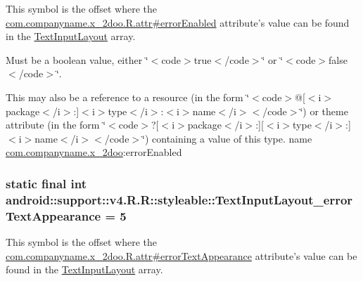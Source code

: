 This symbol is the offset where the \hyperlink{classcom_1_1companyname_1_1x__2doo_1_1_r_1_1attr_29b4019563d2396aa0851e063ee4d087}{com.companyname.x\_\-2doo.R.attr\#errorEnabled} attribute's value can be found in the \hyperlink{classandroid_1_1support_1_1v4_1_1_r_1_1styleable_880beb171ce483ab1b63a82ef7f9d976}{TextInputLayout} array.

Must be a boolean value, either \char`\"{}$<$code$>$true$<$/code$>$\char`\"{} or \char`\"{}$<$code$>$false$<$/code$>$\char`\"{}. 

This may also be a reference to a resource (in the form \char`\"{}$<$code$>$@\mbox{[}$<$i$>$package$<$/i$>$:\mbox{]}$<$i$>$type$<$/i$>$:$<$i$>$name$<$/i$>$$<$/code$>$\char`\"{}) or theme attribute (in the form \char`\"{}$<$code$>$?\mbox{[}$<$i$>$package$<$/i$>$:\mbox{]}\mbox{[}$<$i$>$type$<$/i$>$:\mbox{]}$<$i$>$name$<$/i$>$$<$/code$>$\char`\"{}) containing a value of this type.  name \hyperlink{namespacecom_1_1companyname_1_1x__2doo}{com.companyname.x\_\-2doo}:errorEnabled \hypertarget{classandroid_1_1support_1_1v4_1_1_r_1_1styleable_5d6bfe2c5003f1a81addf1df4b6e7503}{
\subsubsection[{TextInputLayout\_\-errorTextAppearance}]{\setlength{\rightskip}{0pt plus 5cm}static final int android::support::v4.R.R::styleable::TextInputLayout\_\-errorTextAppearance = 5}}
\label{classandroid_1_1support_1_1v4_1_1_r_1_1styleable_5d6bfe2c5003f1a81addf1df4b6e7503}


This symbol is the offset where the \hyperlink{classcom_1_1companyname_1_1x__2doo_1_1_r_1_1attr_4ee123561bac53425997f3cf3edbf9e1}{com.companyname.x\_\-2doo.R.attr\#errorTextAppearance} attribute's value can be found in the \hyperlink{classandroid_1_1support_1_1v4_1_1_r_1_1styleable_880beb171ce483ab1b63a82ef7f9d976}{TextInputLayout} array.

